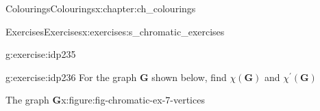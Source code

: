 \documentclass[oneside,10pt,]{book}
\numberwithin{equation}{section}
\newcommand{\bfG}{\mathbf{G}}
\begin{document}
\begin{chapterptx}{Colourings}{}{Colourings}{}{}{x:chapter:ch_colourings}
\begin{exercises-section}{Exercises}{}{Exercises}{}{}{x:exercises:s_chromatic_exercises}
\begin{divisionexercise}{3}{}{}{g:exercise:idp235}
\end{divisionexercise}%
\begin{divisionexercise}{4}{}{}{g:exercise:idp236}%
For the graph \(\bfG\) shown below, find \(\chi(\bfG)\) and \(\chi^\prime(\bfG)\) \begin{figureptx}{The graph \(\bfG\)}{x:figure:fig-chromatic-ex-7-vertices}{}%
\begin{image}{0.15}{0.7}{0.15}%
%
\end{image}%
\tcblower
\end{figureptx}%
%
\end{divisionexercise}%
\end{exercises-section}
\end{chapterptx}
\end{document}
